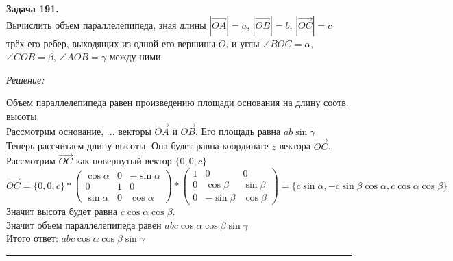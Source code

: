 \documentclass[a4paper, 12pt]{article}
\newenvironment{problem}[2][Задача]
    { \begin{mdframed}[backgroundcolor=gray!10] \textbf{#1 #2.} \\}
    {  \end{mdframed}}
\newenvironment{solution}
    {\textit{Решение: }}
    {\noindent\rule{7in}{1.5pt}}
\begin{document}
\begin{problem}{191}
Вычислить объем параллелепипеда, зная длины $|\overrightarrow{OA}|=a$, $|\overrightarrow{OB}|=b$, $|\overrightarrow{OC}|=c$
трёх его ребер, выходящих из одной его вершины $O$, и углы $\angle BOC=\alpha$, $\angle COB=\beta$, $\angle AOB=\gamma$ между ними.
\end{problem}
\begin{solution}

Объем параллелепипеда равен произведению площади основания на длину соотв. высоты. \\
Рассмотрим основание, ... векторы $\vec{OA}$ и $\vec{OB}$. Его площадь равна $ab\sin{\gamma}$ \\
Теперь рассчитаем длину высоты. Она будет равна координате $z$ вектора $\vec{OC}$. \\
Рассмотрим $\vec{OC}$ как повернутый вектор $\{0, 0, c\}$ \\
$\vec{OC} =
\{0, 0, c\} *
\left(
  \begin{array}{rrr}
    \cos{\alpha} & 0 & -\sin{\alpha} \\
    0 & 1 & 0 \\
    \sin{\alpha} & 0 & \cos{\alpha}
  \end{array}
\right)
*
\left(
  \begin{array}{rrr}
    1 & 0 & 0 \\
    0 & \cos{\beta} & \sin{\beta} \\
    0 & -\sin{\beta} & \cos{\beta}
  \end{array}
\right)
=
\{c\sin{\alpha}, -c\sin{\beta}\cos{\alpha}, c\cos{\alpha}\cos{\beta}\}
$ \\
Значит высота будет равна $c\cos{\alpha}\cos{\beta}$. \\
Значит объем параллелепипеда равен $abc\cos{\alpha}\cos{\beta}\sin{\gamma}$ \\
Итого ответ: $abc\cos{\alpha}\cos{\beta}\sin{\gamma}$

\end{solution}
\end{document}
